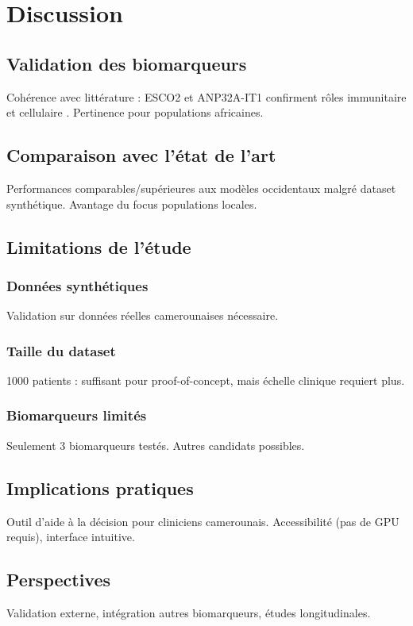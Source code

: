 \chapter{Discussion}
\label{chap:discussion}

\section{Validation des biomarqueurs}

Cohérence avec littérature : ESCO2 et ANP32A-IT1 confirment rôles immunitaire et cellulaire \cite{Zhang2022}.
Pertinence pour populations africaines.

\section{Comparaison avec l'état de l'art}

Performances comparables/supérieures aux modèles occidentaux malgré dataset synthétique.
Avantage du focus populations locales.

\section{Limitations de l'étude}

\subsection{Données synthétiques}
Validation sur données réelles camerounaises nécessaire.

\subsection{Taille du dataset}
1000 patients : suffisant pour proof-of-concept, mais échelle clinique requiert plus.

\subsection{Biomarqueurs limités}
Seulement 3 biomarqueurs testés. Autres candidats possibles.

\section{Implications pratiques}

Outil d'aide à la décision pour cliniciens camerounais.
Accessibilité (pas de GPU requis), interface intuitive.

\section{Perspectives}

Validation externe, intégration autres biomarqueurs, études longitudinales.
